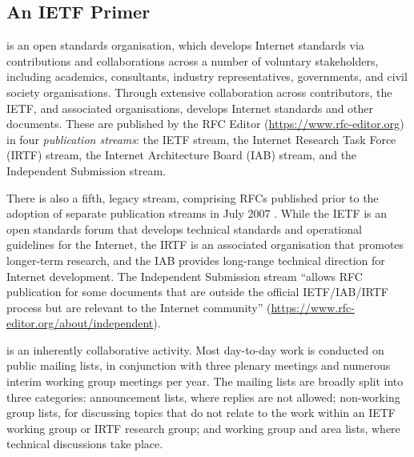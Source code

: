 \documentclass[twocolumn,10pt]{article}
\newcommand{\pb}[1]{\vspace{0.75ex}\noindent{\textbf{#1}}}
\begin{document}
\subsection{An IETF Primer}


\pb{The IETF} is an open standards organisation, which develops
Internet standards via contributions and collaborations across a number of
voluntary stakeholders, including academics, consultants, industry
representatives, governments, and civil society organisations.  Through
extensive collaboration across contributors, the IETF, and associated
organisations, develops Internet standards and other documents. These are
published by the RFC Editor (\url{https://www.rfc-editor.org}) in four
\emph{publication streams}: the IETF stream, the Internet Research Task
Force (IRTF) stream, the Internet Architecture Board (IAB) stream, and the
Independent Submission stream.

There is also a fifth, legacy stream, comprising RFCs published prior to
the adoption of separate publication streams in July 2007 \cite{rfc4844}.
While the IETF is an open standards forum that develops technical standards
and operational guidelines for the Internet, the IRTF is an associated
organisation that promotes longer-term research, and the IAB provides
long-range technical direction for Internet development. The Independent
Submission stream ``allows RFC publication for some documents that are
outside the official IETF/IAB/IRTF process but are relevant to the Internet
community'' (\url{https://www.rfc-editor.org/about/independent}).

\pb{The standards development process} is an inherently collaborative
activity.  Most day-to-day work is conducted on public mailing lists, in
conjunction with three plenary meetings and numerous interim working group
meetings per year. 
The mailing lists are broadly split into three categories: announcement
lists, where replies are not allowed; non-working group lists, for
discussing topics that do not relate to the work within an IETF working
group or IRTF research group; and working group and area lists, where
technical discussions take place.
\end{document}
